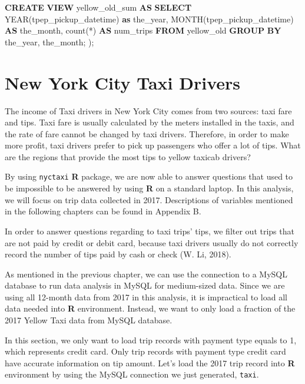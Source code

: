 \documentclass[12pt,twoside]{reedthesis}
\newenvironment{Shaded}{\begin{snugshade}}{\end{snugshade}}
\newcommand{\KeywordTok}[1]{\textcolor[rgb]{0.13,0.29,0.53}{\textbf{#1}}}
\newcommand{\DataTypeTok}[1]{\textcolor[rgb]{0.13,0.29,0.53}{#1}}
\newcommand{\DecValTok}[1]{\textcolor[rgb]{0.00,0.00,0.81}{#1}}
\newcommand{\StringTok}[1]{\textcolor[rgb]{0.31,0.60,0.02}{#1}}
\newcommand{\CommentTok}[1]{\textcolor[rgb]{0.56,0.35,0.01}{\textit{#1}}}
\newcommand{\FunctionTok}[1]{\textcolor[rgb]{0.00,0.00,0.00}{#1}}
\newcommand{\OperatorTok}[1]{\textcolor[rgb]{0.81,0.36,0.00}{\textbf{#1}}}
\newcommand{\NormalTok}[1]{#1}
\theoremstyle{definition}
\theoremstyle{definition}
\theoremstyle{definition}
\theoremstyle{remark}
\begin{document}
\begin{Shaded}
\begin{Highlighting}[]
\KeywordTok{CREATE} \KeywordTok{VIEW}\NormalTok{ yellow_old_sum }\KeywordTok{AS} 
\KeywordTok{SELECT} \DataTypeTok{YEAR}\NormalTok{(tpep_pickup_datetime) }\KeywordTok{as}\NormalTok{ the_year, }\DataTypeTok{MONTH}\NormalTok{(tpep_pickup_datetime) }\KeywordTok{AS}\NormalTok{ the_month, }\FunctionTok{count}\NormalTok{(*) }\KeywordTok{AS}\NormalTok{ num_trips}
  \KeywordTok{FROM}\NormalTok{ yellow_old}
  \KeywordTok{GROUP} \KeywordTok{BY}\NormalTok{ the_year, the_month; }
\NormalTok{); }
\end{Highlighting}
\end{Shaded}
\chapter{New York City Taxi Drivers}\label{chapter3}

The income of Taxi drivers in New York City comes from two sources: taxi
fare and tips. Taxi fare is usually calculated by the meters installed
in the taxis, and the rate of fare cannot be changed by taxi drivers.
Therefore, in order to make more profit, taxi drivers prefer to pick up
passengers who offer a lot of tips. What are the regions that provide
the most tips to yellow taxicab drivers?

By using \texttt{nyctaxi} \textbf{R} package, we are now able to answer
questions that used to be impossible to be answered by using \textbf{R}
on a standard laptop. In this analysis, we will focus on trip data
collected in 2017. Descriptions of variables mentioned in the following
chapters can be found in Appendix B.

In order to answer questions regarding to taxi trips' tips, we filter
out trips that are not paid by credit or debit card, because taxi
drivers usually do not correctly record the number of tips paid by cash
or check (W. Li, 2018).

As mentioned in the previous chapter, we can use the connection to a
MySQL database to run data analysis in MySQL for medium-sized data.
Since we are using all 12-month data from 2017 in this analysis, it is
impractical to load all data needed into \textbf{R} environment.
Instead, we want to only load a fraction of the 2017 Yellow Taxi data
from MySQL database.

In this section, we only want to load trip records with payment type
equals to 1, which represents credit card. Only trip records with
payment type credit card have accurate information on tip amount. Let's
load the 2017 trip record into \textbf{R} environment by using the MySQL
connection we just generated, \texttt{taxi}.
\begin{Shaded}
\end{Shaded}
\end{document}
